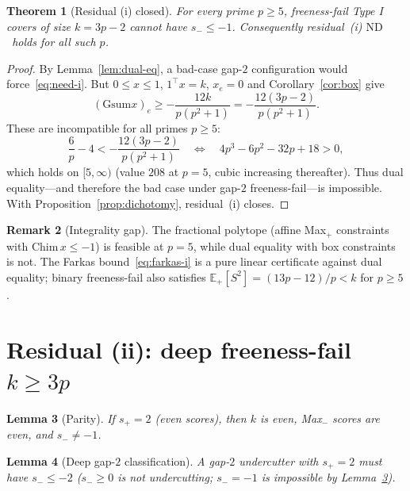 \documentclass[11pt,a4paper]{article}
\theoremstyle{plain}
\newtheorem{theorem}{Theorem}[section]
\newtheorem{lemma}[theorem]{Lemma}
\theoremstyle{definition}
\newtheorem{remark}[theorem]{Remark}
\newcommand{\Gsum}{\mathrm{Gsum}}
\newcommand{\ND}{\ensuremath{\mathrm{ND}}}
\newcommand{\ES}{\mathbb{E}}
\begin{document}
\begin{theorem}[Residual (i) closed]
\label{thm:res-i}
For every prime $p\ge5$, freeness-fail Type I covers of size $k=3p-2$ cannot have
$s_-\le-1$. Consequently residual~(i) \ND\ holds for all such $p$.
\end{theorem}

\begin{proof}
By Lemma~\ref{lem:dual-eq}, a bad-case gap-$2$ configuration would force~\eqref{eq:need-i}.
But $0\le x\le1$, $1^\top x=k$, $x_e=0$ and Corollary~\ref{cor:box} give
\[
(\Gsum x)_e\ge -\frac{12k}{p(p^2+1)}=-\frac{12(3p-2)}{p(p^2+1)}.
\]
These are incompatible for all primes $p\ge5$:
\begin{equation}
\label{eq:farkas-i}
\frac6p-4 < -\frac{12(3p-2)}{p(p^2+1)}
\quad\Longleftrightarrow\quad
4p^3-6p^2-32p+18>0,
\end{equation}
which holds on $[5,\infty)$ (value $208$ at $p=5$, cubic increasing thereafter).
Thus dual equality---and therefore the bad case under gap-$2$ freeness-fail---is impossible.
With Proposition~\ref{prop:dichotomy}, residual~(i) closes.
\end{proof}

\begin{remark}[Integrality gap]
The fractional polytope (affine Max$_+$ constraints with $\mathrm{Chim}\,x\le-1$) is
feasible at $p=5$, while dual equality with box constraints is not.
The Farkas bound~\eqref{eq:farkas-i} is a pure linear certificate against dual equality;
binary freeness-fail also satisfies $\ES_+[S^2]=(13p-12)/p<k$ for $p\ge5$.
\end{remark}

\section{Residual (ii): deep freeness-fail $k\ge3p$}
\label{sec:res-ii}

\begin{lemma}[Parity]
\label{lem:parity}
If $s_+=2$ (even scores), then $k$ is even, Max$_-$ scores are even, and $s_-\neq-1$.
\end{lemma}

\begin{lemma}[Deep gap-$2$ classification]
\label{lem:deep-class}
A gap-$2$ undercutter with $s_+=2$ must have $s_-\le-2$
($s_-\ge0$ is not undercutting; $s_-=-1$ is impossible by Lemma~\ref{lem:parity}).
\end{lemma}
\end{document}
